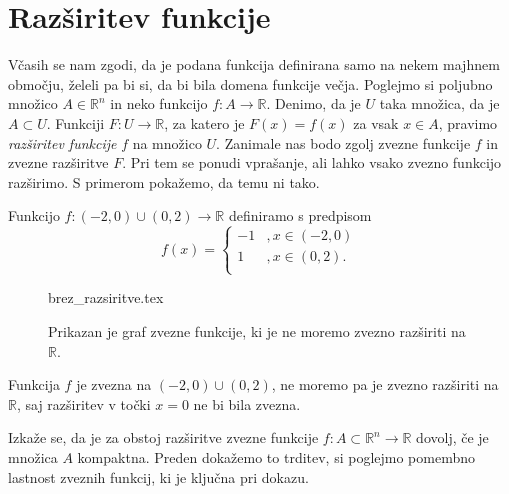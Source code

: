 \documentclass[mat1]{fmfdelo}
\newcommand{\R}{\mathbb R}
\newcommand{\0}{0}
\begin{document}
\section{Razširitev funkcije}\label{raz:siritev}
Včasih se nam zgodi, da je podana funkcija definirana samo na nekem majhnem območju, želeli pa bi si, da bi bila domena funkcije večja. Poglejmo si poljubno množico $A \in \R^n$ in neko funkcijo $f : A \to \R$. Denimo, da je $U$ taka množica, da je $A \subset U$. Funkciji $F : U \to \R$, za katero je $F(x) = f(x)$ za vsak $x \in A$, pravimo \emph{razširitev funkcije} $f$ na množico $U$. Zanimale nas bodo zgolj zvezne funkcije $f$ in zvezne razširitve $F$. Pri tem se ponudi vprašanje, ali lahko vsako zvezno funkcijo razširimo. S primerom pokažemo, da temu ni tako.

\begin{primer}
Funkcijo $f : (-2, 0) \cup (0, 2) \to \R$ definiramo s predpisom
\[  f(x) = \left \{
\begin{array}{ll}
	-1 &, x \in (-2, 0)\\
	1 &, x \in (0, 2). \\
\end{array} 
\right. \]
\begin{figure}[h!]
	\centering
	{brez_razsiritve.tex}
	\caption{Prikazan je graf zvezne funkcije, ki je ne moremo zvezno razširiti na $\R$.}
\end{figure}
Funkcija $f$ je zvezna na $(-2, 0) \cup (0, 2)$, ne moremo pa je zvezno razširiti na $\R$, saj razširitev v točki $x = 0$ ne bi bila zvezna.
\end{primer}

Izkaže se, da je za obstoj razširitve zvezne funkcije $f : A \subset \R^n  \to \R$ dovolj, če je množica $A$ kompaktna. Preden dokažemo to trditev, si poglejmo pomembno lastnost zveznih funkcij, ki je ključna pri dokazu.
\end{document}
